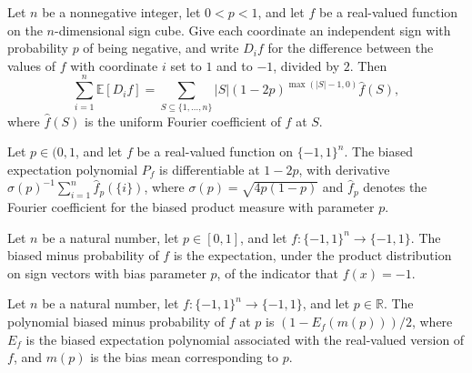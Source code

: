 \begin{theorem}
\label{FABL.sum_productMean_biasedSignPMF_discreteDerivative}
\leanok
{}
Let $n$ be a nonnegative integer, let $0<p<1$, and let $f$ be a real-valued function on
the $n$-dimensional sign cube. Give each coordinate an independent sign with probability
$p$ of being negative, and write $D_i f$ for the difference between the values of $f$
with coordinate $i$ set to $1$ and to $-1$, divided by $2$. Then
\[\sum_{i=1}^n \mathbb{E}[D_i f]=\sum_{S\subseteq\{1,\ldots,n\}} |S|(1-2p)^{\max(|S|-1,0)}\widehat f(S),\]
where $\widehat f(S)$ is the uniform Fourier coefficient of $f$ at $S$.
\end{theorem}

\begin{theorem}
\label{FABL.hasDerivAt_biasedExpectationPolynomial_eq_singletons}
\leanok
{}
Let $p\in(0,1$, and let $f$ be a real-valued function on $\{-1,1\}^n$. The biased
expectation polynomial $P_f$ is differentiable at $1-2p$, with derivative
$\sigma(p)^{-1}\sum_{i=1}^n\widehat f_p(\{i\})$, where $\sigma(p)=\sqrt{4p(1-p)}$
and $\widehat f_p$ denotes the Fourier coefficient for the biased product measure with
parameter $p$.
\end{theorem}

\begin{definition}
\label{FABL.biasedMinusProbability}
\leanok
{}
Let $n$ be a natural number, let $p\in[0,1]$, and let $f:\{-1,1\}^n\to\{-1,1\}$. The
biased minus probability of $f$ is the expectation, under the product distribution on
sign vectors with bias parameter $p$, of the indicator that $f(x)=-1$.
\end{definition}

\begin{definition}
\label{FABL.biasedMinusProbabilityPolynomial}
\leanok
{}
Let $n$ be a natural number, let $f:\{-1,1\}^n\to\{-1,1\}$, and let $p\in\mathbb R$. The
polynomial biased minus probability of $f$ at $p$ is $(1-E_f(m(p)))/2$, where $E_f$ is
the biased expectation polynomial associated with the real-valued version of $f$, and
$m(p)$ is the bias mean corresponding to $p$.
\end{definition}

